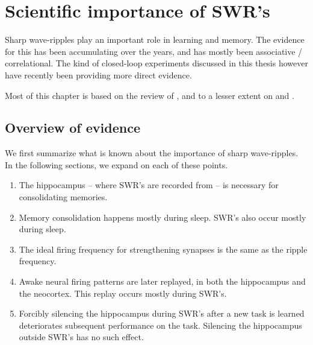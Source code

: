 \chapter{Scientific importance of SWR's}
\label{ch:science}

Sharp wave-ripples play an important role in learning and memory.\footnotemark{} The evidence for this has been accumulating over the years, and has mostly been associative / correlational. The kind of closed-loop experiments discussed in this thesis however have recently been providing more direct evidence.


Most of this chapter is based on the review of \citeauthor{Girardeau2011} \cite{Girardeau2011}, and to a lesser extent on \cite{Buzsaki2015} and \cite{Olafsdottir2018}.




\section{Overview of evidence}

We first summarize what is known about the importance of sharp wave-ripples. In the following sections, we expand on each of these points.

\begin{enumerate}
\item The hippocampus -- where SWR's are recorded from -- is necessary for consolidating memories.
\item Memory consolidation happens mostly during sleep. SWR's also occur mostly during sleep.
\item The ideal firing frequency for strengthening synapses is the same as the ripple frequency.
\item Awake neural firing patterns are later replayed, in both the hippocampus and the neocortex. This replay occurs mostly during SWR's.
\item Forcibly silencing the hippocampus during SWR's after a new task is learned deteriorates subsequent performance on the task. Silencing the hippocampus outside SWR's has no such effect.
\end{enumerate}


